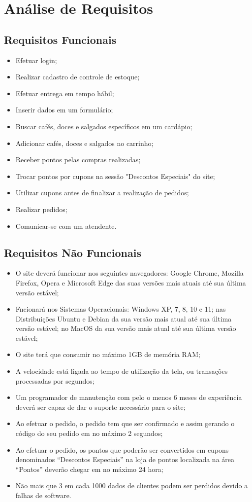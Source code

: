 
\chapter{Análise de Requisitos}

\section{Requisitos Funcionais}
\begin{itemize}
	\item Efetuar login;
	\item Realizar cadastro de controle de estoque;
	\item Efetuar entrega em tempo hábil;
	\item Inserir dados em um formulário;
	\item Buscar cafés, doces e salgados específicos em um cardápio;
	\item Adicionar cafés, doces e salgados no carrinho;
	\item Receber pontos pelas compras realizadas;
	\item Trocar pontos por cupons na sessão "Descontos Especiais" do site;
	\item Utilizar cupons antes de finalizar a realização de pedidos;
	\item Realizar pedidos;
	\item Comunicar-se com um atendente.
\end{itemize}

\section{Requisitos Não Funcionais}
\begin{itemize}
	\item O site deverá funcionar nos seguintes navegadores: Google Chrome, Mozilla Firefox, Opera e Microsoft Edge das suas versões mais atuais até sua última versão estável;
	\item Fncionará nos Sistemas Operacionais: Windows XP, 7, 8, 10 e 11; nas Distribuições Ubuntu e Debian da sua versão mais atual até sua última versão estável; no MacOS da sua versão mais atual até sua última versão estável;
	\item O site terá que consumir no máximo 1GB de memória RAM;
	\item A velocidade está ligada ao tempo de utilização da tela, ou transações
	processadas por segundos;
	\item Um programador de manutenção com pelo o menos 6 meses de
	experiência deverá ser capaz de dar o suporte necessário para o site;
	\item Ao efetuar o pedido, o pedido tem que ser confirmado e assim gerando
	o código do seu pedido em no máximo 2 segundos;
	\item Ao efetuar o pedido, os pontos que poderão ser convertidos em cupons denominados
	“Descontos Especiais” na loja de pontos localizada na área “Pontos” deverão chegar em no máximo 24 hora;
	\item Não mais que 3 em cada 1000 dados de clientes podem ser perdidos
	devido a falhas de software.
\end{itemize}

